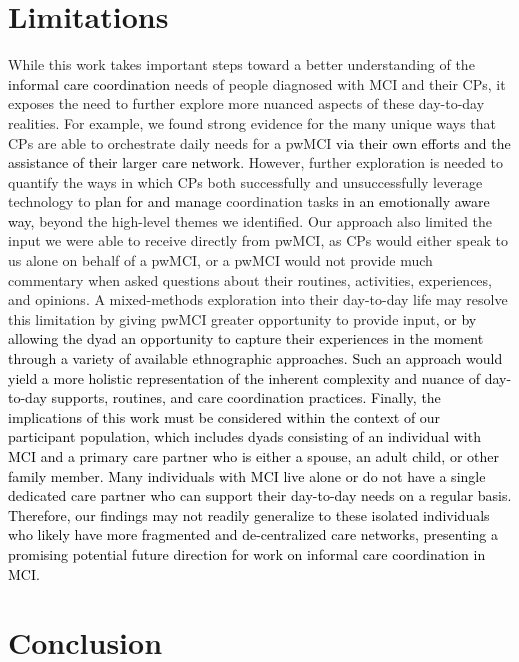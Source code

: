 \documentclass[acmsmall]{acmart}
\begin{document}
\section{Limitations}
While this work takes important steps toward a better understanding of the \textcolor{black}{informal care coordination} needs of people diagnosed with MCI and their CPs, it exposes the need to further explore more nuanced aspects of these day-to-day realities. For example, we found strong evidence for the many unique ways that CPs are able to orchestrate daily needs for a pwMCI \textcolor{black}{via their own efforts and the assistance of their larger care network}. However, further exploration is needed to quantify the ways in which CPs both successfully and unsuccessfully leverage technology to \textcolor{black}{plan for and manage} coordination tasks \textcolor{black}{in an emotionally aware way\textcolor{black}{,} }beyond the high-level themes we identified. Our approach also limited the input we were able to receive directly from pwMCI, as CPs would either speak to us alone on behalf of a pwMCI, or a pwMCI would not provide much commentary when asked questions about their routines, activities, experiences, and opinions. A mixed-methods exploration into their day-to-day life may resolve this limitation by giving pwMCI greater opportunity to provide input\textcolor{black}{, or by allowing the dyad an opportunity to capture their experiences in the moment through a variety of available ethnographic approaches. Such an approach would yield a more holistic representation of the inherent complexity and nuance of day-to-day supports, routines, and care coordination practices.} \textcolor{black}{Finally, the implications of this work must be considered within the context of our participant population, which includes dyads consisting of an individual with MCI and a primary care partner \textcolor{black}{who is} either a spouse\textcolor{black}{,} an adult child\textcolor{black}{, or other family member}. Many individuals with MCI live alone or do not have a single dedicated care partner who can support their day-to-day needs on a regular basis. Therefore, our findings may not readily generalize to these isolated individuals who likely have more fragmented and de-centralized care networks, presenting a promising potential future direction for work on informal care coordination in MCI.}

\section{Conclusion}
\end{document}
